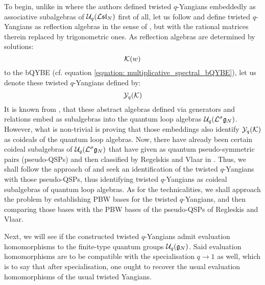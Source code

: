         To begin, unlike in \cite{molev_ragoucy_sorba_twisted_q_yangians_type_A} where the authors defined twisted $q$-Yangians embeddedly as associative subalgebras of $\mathcal{U}_q(\mathcal{L}\mathfrak{sl}_N)$ first of all, let us follow \cite{regelskis_vlaar_reflection_matrices_coideal_subalgebras} and define twisted $q$-Yangians as reflection algebras in the sense of \cite{guay_regelskis_twisted_yangians_for_symmetric_pairs_of_types_BCD}, but with the rational matrices therein replaced by trigonometric ones. As reflection algebras are determined by solutions:
            $$\mathcal{K}(w)$$
        to the bQYBE (cf. equation \eqref{equation: multiplicative_spectral_bQYBE}), let us denote these twisted $q$-Yangians defined by:
            $$\mathcal{Y}_q(\mathcal{K})$$
        It is known from \cite[Subsection 10.2]{regelskis_vlaar_reflection_matrices_coideal_subalgebras}, that these abstract algebras defined via generators and relations embed as subalgebras into the quantum loop algebras $\mathcal{U}_q(\mathcal{L}^{\sigma}\mathfrak{g}_N)$. However, what is non-trivial is proving that those embeddings also identify $\mathcal{Y}_q(\mathcal{K})$ as coideals of the quantum loop algebras. Now, there have already been certain coideal subalgebras of $\mathcal{U}_q(\mathcal{L}^{\sigma}\mathfrak{g}_N)$ that have given as quantum pseudo-symmetric pairs (pseudo-QSPs) and then classified by Regelskis and Vlaar in \cite[Section 8]{regelskis_vlaar_reflection_matrices_coideal_subalgebras}. Thus, we shall follow the approach of \cite{guay_regelskis_twisted_yangians_for_symmetric_pairs_of_types_BCD} and seek an identification of the twisted $q$-Yangians with those pseudo-QSPs, thus identifying twisted $q$-Yangians as coideal subalgebras of quantum loop algebras. As for the technicalities, we shall approach the problem by establishing PBW bases for the twisted $q$-Yangians, and then comparing those bases with the PBW bases of the pseudo-QSPs of Regleskis and Vlaar.


        Next, we will see if the constructed twisted $q$-Yangians admit evaluation homomorphisms to the finite-type quantum groups $\mathcal{U}_q(\mathfrak{g}_N)$. Said evaluation homomorphisms are to be compatible with the specialisation $q \to 1$ as well, which is to say that after specialisation, one ought to recover the usual evaluation homomorphisms of the usual twisted Yangians.